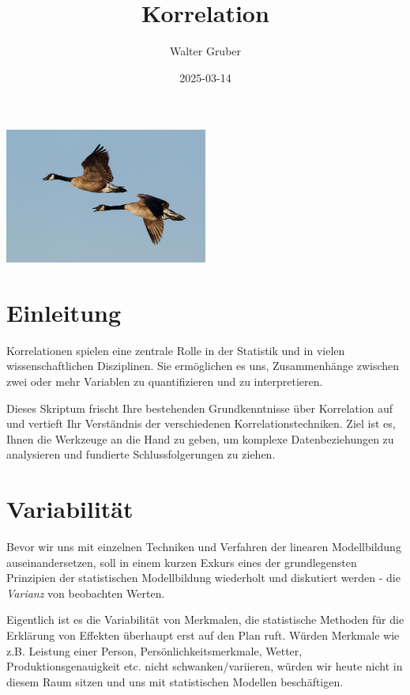 \documentclass[
]{article}
\title{Korrelation}
\author{Walter Gruber}
\date{2025-03-14}
\begin{document}
\maketitle

{
\setcounter{tocdepth}{2}
\tableofcontents
}
\section*{}\label{section}

\includegraphics[width=0.5\textwidth,height=\textheight]{Images/Cover1.jpg}

\section*{Einleitung}\label{einleitung}

Korrelationen spielen eine zentrale Rolle in der Statistik und in vielen wissenschaftlichen Disziplinen. Sie ermöglichen es uns, Zusammenhänge zwischen zwei oder mehr Variablen zu quantifizieren und zu interpretieren.

Dieses Skriptum frischt Ihre bestehenden Grundkenntnisse über Korrelation auf und vertieft Ihr Verständnis der verschiedenen Korrelationstechniken. Ziel ist es, Ihnen die Werkzeuge an die Hand zu geben, um komplexe Datenbeziehungen zu analysieren und fundierte Schlussfolgerungen zu ziehen.

\section*{Variabilität}\label{variabilituxe4t}

Bevor wir uns mit einzelnen Techniken und Verfahren der linearen Modellbildung auseinandersetzen, soll in einem kurzen Exkurs eines der grundlegensten Prinzipien der statistischen Modellbildung wiederholt und diskutiert werden - die \emph{Varianz} von beobachten Werten.

Eigentlich ist es die Variabilität von Merkmalen, die statistische Methoden für die Erklärung von Effekten überhaupt erst auf den Plan ruft. Würden Merkmale wie z.B. Leistung einer Person, Persönlichkeitsmerkmale, Wetter, Produktionsgenauigkeit etc. nicht schwanken/variieren, würden wir heute nicht in diesem Raum sitzen und uns mit statistischen Modellen beschäftigen.
\end{document}
